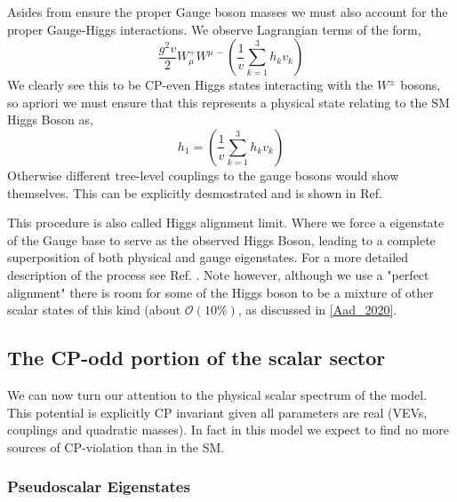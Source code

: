 Asides from ensure the proper Gauge boson masses we must also account for the proper Gauge-Higgs interactions. We observe Lagrangian terms of the form, 
\begin{equation}
\frac{g^2 v}{2} W^+_\mu W^{\mu \, -} \left( \frac{1}{v} \sum_{k=1}^3 h_k v_k \right) 
\end{equation}
We clearly see this to be CP-even Higgs states interacting with the $W^\pm$ bosons, so apriori we must ensure that this represents a physical state relating to the SM Higgs Boson as, 
\begin{equation}
h_1 = \left( \frac{1}{v} \sum_{k=1}^3 h_k v_k \right) 
\end{equation}
Otherwise different tree-level couplings to the gauge bosons would show themselves. This can be explicitly desmostrated and is shown in Ref.~\cite{das2015implications} 

This procedure is also called Higgs alignment limit. Where we force a eigenstate of the Gauge base to serve as the observed Higgs Boson, leading to a complete superposition of both physical and gauge eigenstates. For a more detailed description of the process see Ref. \cite{Ian_Thesis}.  
%
Note however, although we use a "perfect alignment" there is room for some of the Higgs boson to be a mixture of other scalar states of this kind (about $\mathcal{O}(10\%)$, as discussed in \ref{Aad_2020}. 

\subsection{The CP-odd portion of the scalar sector}

We can now turn our attention to the physical scalar spectrum of the model. 
%
This potential is explicitly CP invariant given all parameters are real (VEVs, couplings and quadratic masses). In fact in this model we expect to find no more sources of CP-violation than in the SM.

\subsubsection{Pseudoscalar Eigenstates}

